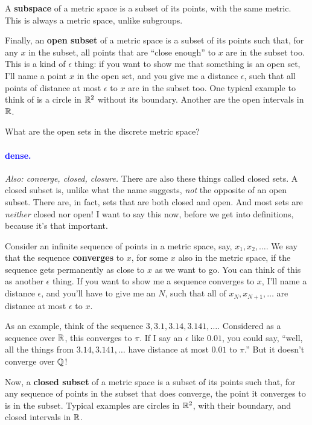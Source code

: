 \documentclass[11pt,paper=letter]{scrartcl}
\renewcommand{\bluebf}[1]{{\bfseries \color{Blue} #1}}
\renewcommand\wp[1]{\paragraph{\textcolor{Blue}{#1.}} \hspace{-1em}}
\newcommand\wl[1]{\label{w:#1}}
\newcommand\oww[1]{\textit{Also: #1.}}
\begin{document}
A \textbf{subspace} of a metric space is a subset of its points, with the same metric. This is always a metric space, unlike subgroups.

Finally, an \bluebf{open subset} of a metric space is a subset of its points such that, for any $x$ in the subset, all points that are ``close enough'' to $x$ are in the subset too. This is a kind of $\epsilon$ thing: if you want to show me that something is an open set, I'll name a point $x$ in the open set, and you give me a distance $\epsilon$, such that all points of distance at most $\epsilon$ to $x$ are in the subset too. One typical example to think of is a circle in $\mathbb R^2$ without its boundary. Another are the open intervals in $\mathbb R$.

\begin{exrboxed}
  What are the open sets in the discrete metric space?
\end{exrboxed}

\wp{dense}
\wl{dense}
\oww{converge, closed, closure}
There are also these things called closed sets. A closed subset is, unlike what the name suggests, \textit{not} the opposite of an open subset. There are, in fact, sets that are both closed and open. And most sets are \textit{neither} closed nor open! I want to say this now, before we get into definitions, because it's that important.

Consider an infinite sequence of points in a metric space, say, $ x_1, x_2 , \ldots $. We say that the sequence \textbf{converges} to $ x $, for some $x$ also in the metric space, if the sequence gets permanently as close to $x$ as we want to go. You can think of this as another $\epsilon$ thing. If you want to show me a sequence converges to $x$, I'll name a distance $\epsilon$, and you'll have to give me an $N$, such that all of $x_N, x_{N+1}, \ldots$ are distance at most $\epsilon$ to $x$.

As an example, think of the sequence $3, 3.1, 3.14, 3.141, \ldots$. Considered as a sequence over $\mathbb R$, this converges to $\pi$. If I say an $\epsilon$ like $0.01$, you could say, ``well, all the things from $3.14, 3.141, \ldots$ have distance at most $0.01$ to $\pi$.'' But it doesn't converge over $\mathbb Q$!

Now, a \textbf{closed subset} of a metric space is a subset of its points such that, for any sequence of points in the subset that does converge, the point it converges to is in the subset. Typical examples are circles in $\mathbb R^2$, with their boundary, and closed intervals in $\mathbb R$.
\end{document}
